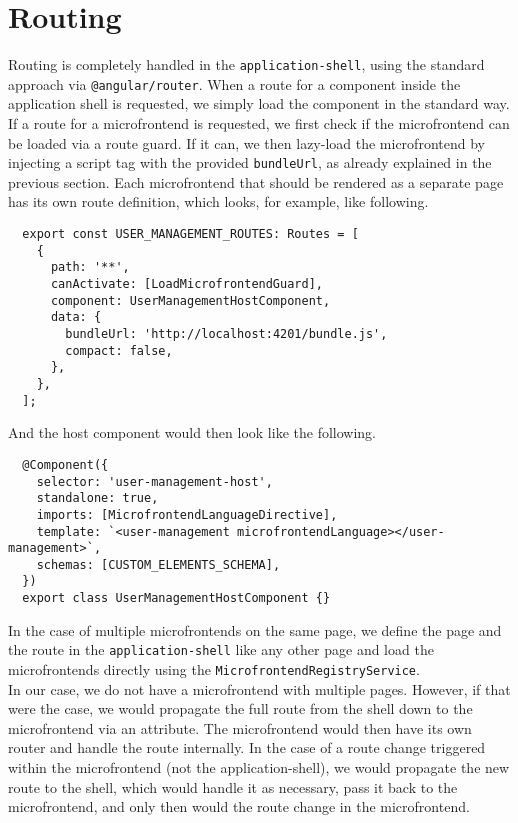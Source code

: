 \section{Routing}
Routing is completely handled in the \texttt{application-shell}, using the standard approach via \texttt{@angular/router}. When a route for a component inside the application shell is requested, we simply load the component in the standard way. If a route for a microfrontend is requested, we first check if the microfrontend can be loaded via a route guard. If it can, we then lazy-load the microfrontend by injecting a script tag with the provided \texttt{bundleUrl}, as already explained in the previous section. Each microfrontend that should be rendered as a separate page has its own route definition, which looks, for example, like following.
\begin{verbatim}
  export const USER_MANAGEMENT_ROUTES: Routes = [
    {
      path: '**',
      canActivate: [LoadMicrofrontendGuard],
      component: UserManagementHostComponent,
      data: {
        bundleUrl: 'http://localhost:4201/bundle.js',
        compact: false,
      },
    },
  ];
\end{verbatim}
And the host component would then look like the following.
\begin{verbatim}
  @Component({
    selector: 'user-management-host',
    standalone: true,
    imports: [MicrofrontendLanguageDirective],
    template: `<user-management microfrontendLanguage></user-management>`,
    schemas: [CUSTOM_ELEMENTS_SCHEMA],
  })
  export class UserManagementHostComponent {}
\end{verbatim}
In the case of multiple microfrontends on the same page, we define the page and the route in the \texttt{application-shell} like any other page and load the microfrontends directly using the \texttt{MicrofrontendRegistryService}. \\

\noindent
In our case, we do not have a microfrontend with multiple pages. However, if that were the case, we would propagate the full route from the shell down to the microfrontend via an attribute. The microfrontend would then have its own router and handle the route internally. In the case of a route change triggered within the microfrontend (not the application-shell), we would propagate the new route to the shell, which would handle it as necessary, pass it back to the microfrontend, and only then would the route change in the microfrontend.